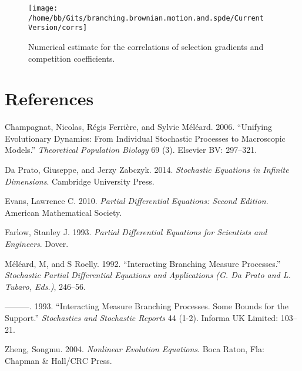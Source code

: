 \documentclass[]{article}
\begin{document}
\begin{figure}[H]

{\centering \texttt{[image: /home/bb/Gits/branching.brownian.motion.and.spde/Current Version/corrs]} 

}

\caption{\label{num_corr} Numerical estimate for the correlations of selection gradients and competition coefficients.}\label{fig:unnamed-chunk-1}
\end{figure}

\newpage

\hypertarget{references}{%
\section*{References}\label{references}}

\hypertarget{refs}{}
\leavevmode\hypertarget{ref-Champagnat2006}{}%
Champagnat, Nicolas, Régis Ferrière, and Sylvie Méléard. 2006.
``Unifying Evolutionary Dynamics: From Individual Stochastic Processes
to Macroscopic Models.'' \emph{Theoretical Population Biology} 69 (3).
Elsevier BV: 297--321.

\leavevmode\hypertarget{ref-DaPrato2014}{}%
Da Prato, Giuseppe, and Jerzy Zabczyk. 2014. \emph{Stochastic Equations
in Infinite Dimensions}. Cambridge University Press.

\leavevmode\hypertarget{ref-lawrenceevans2010}{}%
Evans, Lawrence C. 2010. \emph{Partial Differential Equations: Second
Edition}. American Mathematical Society.

\leavevmode\hypertarget{ref-stanleyfarlow1993}{}%
Farlow, Stanley J. 1993. \emph{Partial Differential Equations for
Scientists and Engineers}. Dover.

\leavevmode\hypertarget{ref-meleard1992interacting}{}%
Méléard, M, and S Roelly. 1992. ``Interacting Branching Measure
Processes.'' \emph{Stochastic Partial Differential Equations and
Applications (G. Da Prato and L. Tubaro, Eds.)}, 246--56.

\leavevmode\hypertarget{ref-Mlard1993}{}%
---------. 1993. ``Interacting Measure Branching Processes. Some Bounds
for the Support.'' \emph{Stochastics and Stochastic Reports} 44 (1-2).
Informa UK Limited: 103--21.

\leavevmode\hypertarget{ref-zheng2004nonlinear}{}%
Zheng, Songmu. 2004. \emph{Nonlinear Evolution Equations}. Boca Raton,
Fla: Chapman \& Hall/CRC Press.
\end{document}
